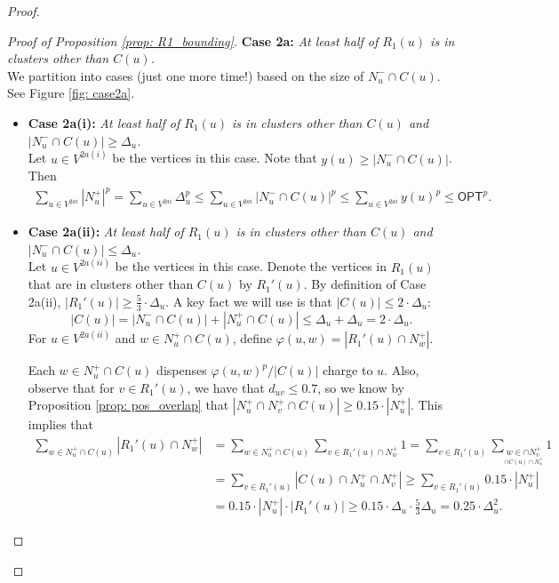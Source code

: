 \begin{proof}
\begin{proof}[Proof of Proposition \ref{prop: R1_bounding}]
\noindent\textbf{Case 2a:} \emph{ At least half of $R_1(u)$ is in clusters other than $C(u)$.} \\
We partition into cases (just one more time!) based on the size of $N_u^- \cap C(u)$. See Figure \ref{fig: case2a}.
    \begin{itemize}
        \item \textbf{Case 2a(i):} \emph{At least half of $R_1(u)$ is in clusters other than $C(u)$ and $|N_u^- \cap C(u)| \geq \Delta_u$. }\\
        Let $ u \in  V^{2a(i)}$ be the vertices in this case.
        Note that $y(u) \geq |N_u^- \cap C(u)|$. Then
        \begin{align*}
        \boxed{
        \sum_{ u \in  V^{2ai}} |N_u^+|^p 
        = \sum_{ u \in  V^{2ai}} \Delta_u^p 
        \leq \sum_{ u \in  V^{2ai}} |N_u^- \cap C(u)|^p 
        \leq \sum_{ u \in  V^{2ai}} y(u)^p 
        \leq \textsf{OPT}^p.}
        \end{align*}
        \item \textbf{Case 2a(ii):}\emph{ At least half of $R_1(u)$ is in clusters other than $C(u)$ and $|N_u^- \cap C(u)| \leq \Delta_u$.}\\ 

        Let $ u \in  V^{2a(ii)}$ be the vertices in this case.
    Denote the vertices in $R_1(u)$ that are in clusters other than $C(u)$ by $R_1'(u)$. By definition of Case 2a(ii), $|R_1'(u)| \geq \frac{5}{3} \cdot \Delta_u$. 
        A key fact we will use is that $|C(u)| \leq 2 \cdot \Delta_u$:
        $$|C(u)| = |N_u^- \cap C(u)| + |N_u^+ \cap C(u)| \leq \Delta_u + \Delta_u = 2 \cdot \Delta_u.$$
        For $u \in  V^{2a(ii)}$ and $w \in N_u^+ \cap C(u)$, define 
        $\varphi(u,w) = |R_1'(u) \cap N_w^+|.$


        Each $w \in N_u^+ \cap C(u)$ dispenses 
        $\varphi(u,w)^p/|C(u)|$ charge to $u$. Also, observe that for $v \in R_1'(u)$, we have that $d_{uv} \leq 0.7$, so we know by Proposition \ref{prop: pos_overlap} that $|N_u^+ \cap N_v^+ \cap C(u)| \geq 0.15 \cdot |N_u^+|$. This implies that 
                \begin{align*}\sum_{w \in N_u^+ \cap C(u)} |R_1'(u)  \cap N_w^+|  
                &= \sum_{w \in N_u^+ \cap C(u)} \sum_{v \in R_1'(u)  \cap N_w^+} 1  
                = \sum_{v \in R_1'(u)} \sum_{\underset{ \cap C(u) \cap N_u^+}{w \in  \cap N_v^+}} 1 \\
               & = \sum_{v \in R_1'(u)} | C(u) \cap N_u^+ \cap N_v^+| \geq 
                \sum_{v \in R_1'(u)} 0.15\cdot | N_u^+ | \\
                &= 
                 0.15 \cdot |N_u^+| \cdot |R_1'(u)| \geq 0.15 \cdot \Delta_u \cdot \frac{5}{3}\Delta_u = 0.25 \cdot \Delta_u^2.
                \end{align*}


\end{itemize}
\end{proof}
\end{proof}

